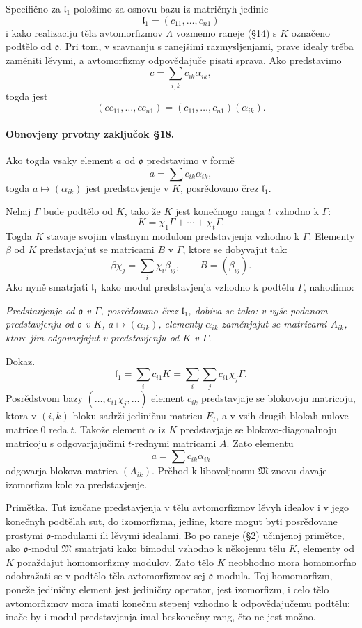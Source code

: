 \documentclass[11pt]{article}
\providecommand{\mo}{\mathfrak{o}}
\providecommand{\ml}{\mathfrak{l}}
\providecommand{\mM}{\mathfrak{M}}
\begin{document}
Specifično za $\ml_1$ položimo za osnovu bazu iz matričnyh jedinic
\[
        \ml_1=(c_{11},\ldots,c_{n1})
\]
i kako realizaciju těla avtomorfizmov $\Lambda$ vozmemo raneje (§14) s $K$ označeno podtělo od $\mo$. Pri tom, v sravnanju s ranejšimi razmysljenjami, prave idealy trěba zaměniti lěvymi, a avtomorfizmy odpovědajuče pisati sprava. Ako predstavimo
\[
        c=\sum_{i,k} c_{ik}\alpha_{ik},
\]
togda jest
\[
        (cc_{11},\ldots,cc_{n1})=(c_{11},\ldots,c_{n1})(\alpha_{ik}).
\]

\paragraph{Obnovjeny prvotny zaključok §18.}
Ako togda vsaky element $a$ od $\mo$ predstavimo v formě
\[
        a=\sum c_{ik}\alpha_{ik},
\]
togda $a\mapsto(\alpha_{ik})$ jest predstavjenje v $K$, posrědovano črez $\ml_1$.

Nehaj $\Gamma$ bude podtělo od $K$, tako že $K$ jest konečnogo ranga $t$ vzhodno k $\Gamma$:
\[
        K=\chi_1\Gamma+\cdots+\chi_t\Gamma .
\]
Togda $K$ stavaje svojim vlastnym modulom predstavjenja vzhodno k $\Gamma$. Elementy $\beta$ od $K$ predstavjajut se matricami $B$ v $\Gamma$, ktore se dobyvajut tak:
\[
        \beta\chi_j=\sum_i\chi_i\beta_{ij},\qquad B=(\beta_{ij}).
\]
Ako nyně smatrjati $\ml_1$ kako modul predstavjenja vzhodno k podtělu $\Gamma$, nahodimo:

\emph{Predstavjenje od $\mo$ v $\Gamma$, posrědovano črez $\ml_1$, dobiva se tako: v vyše podanom predstavjenju od $\mo$ v $K$, $a\mapsto(\alpha_{ik})$, elementy $\alpha_{ik}$ zaměnjajut se matricami $A_{ik}$, ktore jim odgovarjajut v predstavjenju od $K$ v $\Gamma$.}

Dokaz.
\[
        \ml_1=\sum_i c_{i1}K=\sum_i\sum_j c_{i1}\chi_j\Gamma .
\]
Posrědstvom bazy $(\ldots,c_{i1}\chi_j,\ldots)$ element $c_{ik}$ predstavjaje se blokovoju matricoju, ktora v $(i,k)$-bloku sadrži jediničnu matricu $E_t$, a v vsih drugih blokah nulove matrice $0$ reda $t$. Takože element $\alpha$ iz $K$ predstavjaje se blokovo-diagonalnoju matricoju s odgovarjajučimi $t$-rednymi matricami $A$. Zato elementu
\[
        a=\sum c_{ik}\alpha_{ik}
\]
odgovarja blokova matrica $(A_{ik})$. Prěhod k libovoljnomu $\mM$ znovu davaje izomorfizm kolc za predstavjenje.

Primětka. Tut izučane predstavjenja v tělu avtomorfizmov lěvyh idealov i v jego konečnyh podtělah sut, do izomorfizma, jedine, ktore mogut byti posrědovane prostymi $\mo$-modulami ili lěvymi idealami. Bo po raneje (§2) učinjenoj primětce, ako $\mo$-modul $\mM$ smatrjati kako bimodul vzhodno k někojemu tělu $K$, elementy od $K$ poraždajut homomorfizmy modulov. Zato tělo $K$ neobhodno mora homomorfno odobražati se v podtělo těla avtomorfizmov sej $\mo$-modula. Toj homomorfizm, poneže jediničny element jest jediničny operator, jest izomorfizm, i celo tělo avtomorfizmov mora imati konečnu stepenj vzhodno k odpovědajučemu podtělu; inače by i modul predstavjenja imal beskonečny rang, čto ne jest možno.
\end{document}
